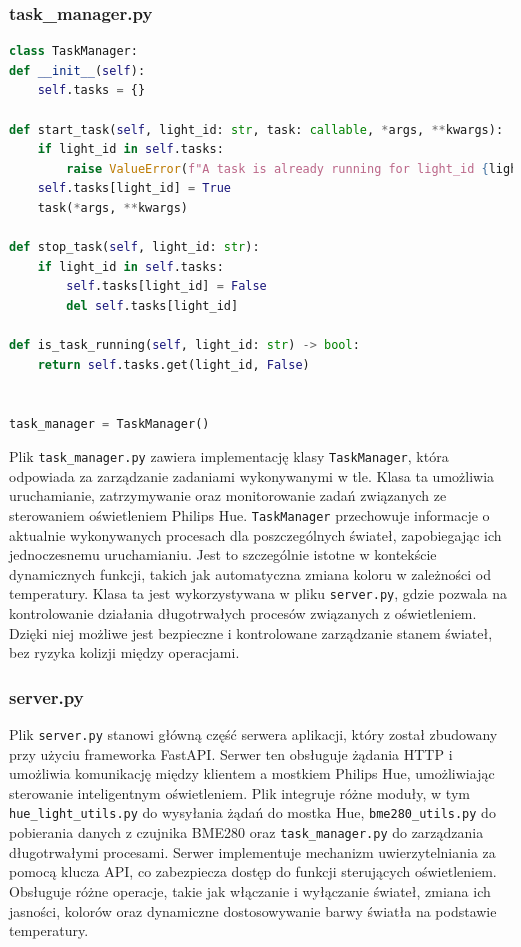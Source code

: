\documentclass[12pt]{article}
\begin{document}
\subsubsection{task\_manager.py}
\begin{lstlisting}[language=Python]
class TaskManager:
def __init__(self):
    self.tasks = {}

def start_task(self, light_id: str, task: callable, *args, **kwargs):
    if light_id in self.tasks:
        raise ValueError(f"A task is already running for light_id {light_id}.")
    self.tasks[light_id] = True
    task(*args, **kwargs)

def stop_task(self, light_id: str):
    if light_id in self.tasks:
        self.tasks[light_id] = False
        del self.tasks[light_id]

def is_task_running(self, light_id: str) -> bool:
    return self.tasks.get(light_id, False)


task_manager = TaskManager()
\end{lstlisting}
Plik \texttt{task\_manager.py} zawiera implementację klasy \texttt{TaskManager}, która odpowiada za zarządzanie zadaniami wykonywanymi w tle. Klasa ta umożliwia uruchamianie, zatrzymywanie oraz
monitorowanie zadań związanych ze sterowaniem oświetleniem Philips Hue. \texttt{TaskManager} przechowuje informacje o aktualnie wykonywanych procesach dla poszczególnych świateł, zapobiegając
ich jednoczesnemu uruchamianiu. Jest to szczególnie istotne w kontekście dynamicznych funkcji, takich jak automatyczna zmiana koloru w zależności od temperatury. Klasa ta jest wykorzystywana w pliku
\texttt{server.py}, gdzie pozwala na kontrolowanie działania długotrwałych procesów związanych z oświetleniem. Dzięki niej możliwe jest bezpieczne i kontrolowane zarządzanie stanem świateł,
bez ryzyka kolizji między operacjami.

\subsubsection{server.py}
Plik \texttt{server.py} stanowi główną część serwera aplikacji, który został zbudowany przy użyciu frameworka FastAPI. Serwer ten obsługuje żądania HTTP i umożliwia komunikację między klientem
a mostkiem Philips Hue, umożliwiając sterowanie inteligentnym oświetleniem. Plik integruje różne moduły, w tym \texttt{hue\_light\_utils.py} do wysyłania żądań do mostka Hue, \texttt{bme280\_utils.py}
do pobierania danych z czujnika BME280 oraz \texttt{task\_manager.py} do zarządzania długotrwałymi procesami. Serwer implementuje mechanizm uwierzytelniania za pomocą klucza API, co zabezpiecza
dostęp do funkcji sterujących oświetleniem. Obsługuje różne operacje, takie jak włączanie i wyłączanie świateł, zmiana ich jasności, kolorów oraz dynamiczne dostosowywanie barwy światła na podstawie temperatury. 
\end{document}
